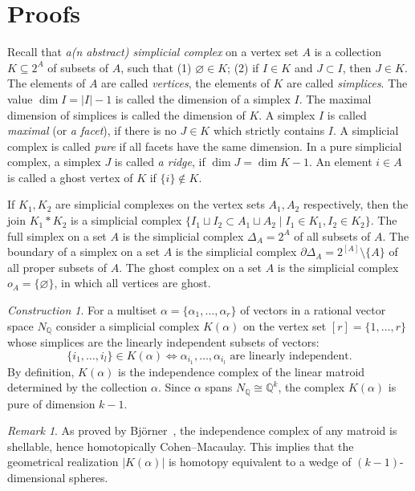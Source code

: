 \documentclass[english,12pt,oneside]{amsproc}
\newcommand{\Qo}{\mathbb{Q}}
\newcommand{\dd}{\partial}
\newcommand{\Nq}{N_\Qo}
\newcounter{stmcounter}[section]
\numberwithin{equation}{section}
\theoremstyle{plain}
\theoremstyle{definition}
\theoremstyle{remark}
\newtheorem{rem}[stmcounter]{Remark}
\newtheorem{con}[stmcounter]{Construction}
\begin{document}
\section{Proofs}\label{secProofs}

Recall that \emph{a(n abstract) simplicial complex} on a vertex set $A$ is a collection $K\subseteq 2^A$ of subsets of $A$, such that (1) $\varnothing\in K$; (2) if $I\in K$ and $J\subset I$, then $J\in K$. The elements of $A$ are called \emph{vertices}, the elements of $K$ are called \emph{simplices}. The value $\dim I = |I|-1$ is called the dimension of a simplex $I$. The maximal dimension of simplices is called the dimension of $K$. A simplex $I$ is called \emph{maximal} (or \emph{a facet}), if there is no $J\in K$ which strictly contains $I$. A simplicial complex is called \emph{pure} if all facets have the same dimension. In a pure simplicial complex, a simplex $J$ is called \emph{a ridge}, if $\dim J=\dim K-1$. An element $i\in A$ is called a ghost vertex of $K$ if $\{i\}\notin K$.

If $K_1,K_2$ are simplicial complexes on the vertex sets $A_1,A_2$ respectively, then the join $K_1\ast K_2$ is a simplicial complex $\{I_1\sqcup I_2\subset A_1\sqcup A_2\mid I_1\in K_1, I_2\in K_2\}$. The full simplex on a set $A$ is the simplicial complex $\Delta_A=2^A$ of all subsets of $A$. The boundary of a simplex on a set $A$ is the simplicial complex $\dd\Delta_A=2^{[A]}\setminus\{A\}$ of all proper subsets of $A$. The ghost complex on a set $A$ is the simplicial complex $o_A=\{\varnothing\}$, in which all vertices are ghost.

\begin{con}\label{conIndepComplex}
For a multiset $\alpha=\{\alpha_1,\ldots,\alpha_r\}$ of vectors in a rational vector space $\Nq$ consider a simplicial complex $K(\alpha)$ on the vertex set $[r]=\{1,\ldots,r\}$ whose simplices are the linearly independent subsets of vectors:
\[
\{i_1,\ldots,i_l\}\in K(\alpha)\Leftrightarrow \alpha_{i_1},\ldots,\alpha_{i_l} \text{ are linearly independent}.
\]
By definition, $K(\alpha)$ is the independence complex of the linear matroid determined by the collection $\alpha$. Since $\alpha$ spans $\Nq\cong\Qo^k$, the complex $K(\alpha)$ is pure of dimension $k-1$.
\end{con}

\begin{rem}\label{remWedges}
As proved by Bj\"{o}rner~\cite{Bjorner}, the independence complex of any matroid is shellable, hence homotopically Cohen--Macaulay. This implies that the geometrical realization $|K(\alpha)|$ is homotopy equivalent to a wedge of $(k-1)$-dimensional spheres.
\end{rem}
\end{document}
